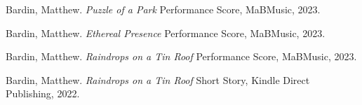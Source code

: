 \begin{thebibliography}{99} %






 Bardin, Matthew. \emph{Puzzle of a Park} Performance Score, MaBMusic, 2023.

 Bardin, Matthew. \emph{Ethereal Presence} Performance Score, MaBMusic, 2023.

 Bardin, Matthew. \emph{Raindrops on a Tin Roof} Performance Score, MaBMusic, 2023.

 Bardin, Matthew. \emph{Raindrops on a Tin Roof} Short Story, Kindle Direct Publishing, 2022.


\end{thebibliography}
